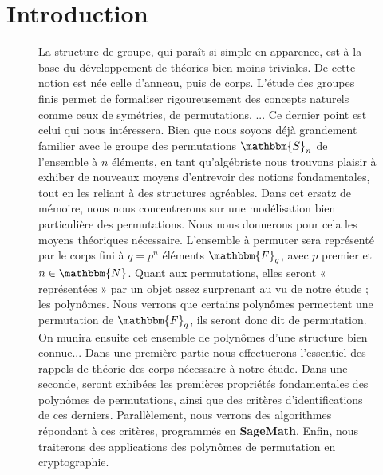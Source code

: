 \documentclass[12pt]{article}
\theoremstyle{remark}\newtheorem{note}{Note}
\theoremstyle{remark}\newtheorem{nota}{Notation}
\newcommand{\Fq}{\mathbbm{F}_q}
\theoremstyle{definition}
\begin{document}
\section*{Introduction}
\begin{figure}[h]
La structure de groupe, qui paraît si simple en apparence, est à la base du développement de théories bien moins triviales. De cette notion est née celle d’anneau, puis de corps. L’étude des groupes finis permet de formaliser rigoureusement des concepts naturels comme ceux de symétries, de permutations, ... Ce dernier point est celui qui nous intéressera. Bien que nous soyons déjà grandement familier avec le groupe des permutations $\mathbbm{S}_n$ de l’ensemble à $n$ éléments, en tant qu’algébriste nous trouvons plaisir à exhiber de nouveaux moyens d'entrevoir des notions fondamentales, tout en les reliant à des structures agréables. \newline
Dans cet ersatz de mémoire, nous nous concentrerons sur une modélisation bien particulière des permutations. \newline
Nous nous donnerons pour cela les moyens théoriques nécessaire. L’ensemble à permuter sera représenté par le corps fini à $q = p^n$ éléments $\Fq$, avec $p$ premier et $n \in \mathbbm{N}$. Quant aux permutations, elles seront « représentées » par un objet assez surprenant au vu de notre étude ; les polynômes. Nous verrons que certains polynômes permettent une permutation de $\Fq$, ils seront donc dit de permutation. On munira ensuite cet ensemble de polynômes d'une structure bien connue...\newline
\break
Dans une première partie nous effectuerons l’essentiel des rappels de théorie des corps nécessaire à notre étude. Dans une seconde, seront exhibées les premières propriétés fondamentales des polynômes de permutations, ainsi que des critères d'identifications de ces derniers. Parallèlement, nous verrons des algorithmes répondant à ces critères, programmés en \textbf{SageMath}. Enfin, nous traiterons des applications des polynômes de permutation en cryptographie.

\end{figure}

\vfill \eject


\pagebreak 
\end{document}
